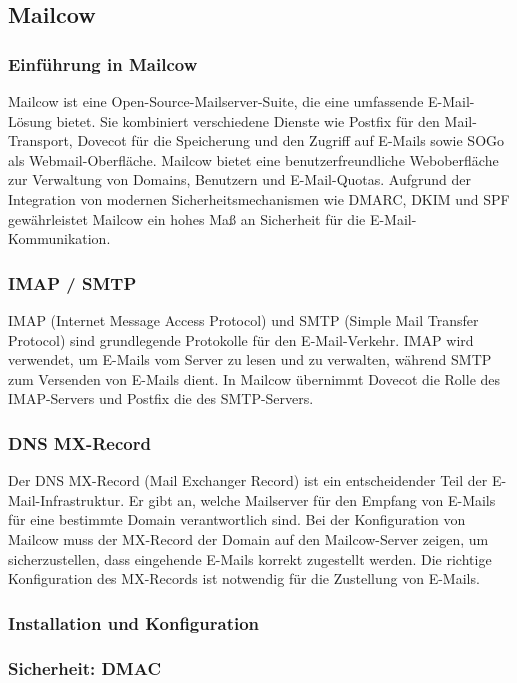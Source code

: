 \subsection{Mailcow}

\subsubsection{Einführung in Mailcow}
Mailcow ist eine Open-Source-Mailserver-Suite, die eine umfassende E-Mail-Lösung bietet. Sie kombiniert 
verschiedene Dienste wie Postfix für den Mail-Transport, Dovecot für die Speicherung und den Zugriff auf 
E-Mails sowie SOGo als Webmail-Oberfläche. Mailcow bietet eine benutzerfreundliche Weboberfläche zur 
Verwaltung von Domains, Benutzern und E-Mail-Quotas. Aufgrund der Integration von modernen Sicherheitsmechanismen 
wie DMARC, DKIM und SPF gewährleistet Mailcow ein hohes Maß an Sicherheit für die E-Mail-Kommunikation.

\subsubsection{IMAP / SMTP}
IMAP (Internet Message Access Protocol) und SMTP (Simple Mail Transfer Protocol) sind grundlegende Protokolle 
für den E-Mail-Verkehr. IMAP wird verwendet, um E-Mails vom Server zu lesen und zu verwalten, während SMTP zum 
Versenden von E-Mails dient. In Mailcow übernimmt Dovecot die Rolle des IMAP-Servers und Postfix die des 
SMTP-Servers. 

\subsubsection{DNS MX-Record}
Der DNS MX-Record (Mail Exchanger Record) ist ein entscheidender Teil der E-Mail-Infrastruktur. Er gibt an, 
welche Mailserver für den Empfang von E-Mails für eine bestimmte Domain verantwortlich sind. Bei der Konfiguration 
von Mailcow muss der MX-Record der Domain auf den Mailcow-Server zeigen, um sicherzustellen, dass eingehende 
E-Mails korrekt zugestellt werden. Die richtige Konfiguration des MX-Records ist notwendig für die Zustellung 
von E-Mails.

\subsubsection{Installation und Konfiguration}

\subsubsection{Sicherheit: DMAC}

